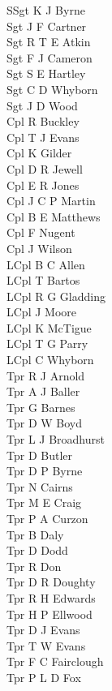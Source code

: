 \begin{multicols}{3}
  \small
  \noindent
  SSgt K J Byrne \\
  Sgt J F Cartner \\
  Sgt R T E Atkin \\
  Sgt F J Cameron \\
  Sgt S E Hartley \\
  Sgt C D Whyborn \\
  Sgt J D Wood \\
  Cpl R Buckley \\
  Cpl T J Evans \\
  Cpl K Gilder \\
  Cpl D R Jewell \\
  Cpl E R Jones \\
  Cpl J C P Martin \\
  Cpl B E Matthews \\
  Cpl F Nugent \\
  Cpl J Wilson \\
  LCpl B C Allen \\
  LCpl T Bartos \\
  LCpl R G Gladding \\
  LCpl J Moore \\
  LCpl K McTigue \\
  LCpl T G Parry \\
  LCpl C Whyborn \\
  Tpr R J Arnold \\
  Tpr A J Baller \\
  Tpr G Barnes \\
  Tpr D W Boyd \\
  Tpr L J Broadhurst \\
  Tpr D Butler \\
  Tpr D P Byrne \\
  Tpr N Cairns \\
  Tpr M E Craig \\
  Tpr P A Curzon \\
  Tpr B Daly \\
  Tpr D Dodd \\
  Tpr R Don \\
  Tpr D R Doughty \\
  Tpr R H Edwards \\
  Tpr H P Ellwood \\
  Tpr D J Evans \\
  Tpr T W Evans \\
  Tpr F C Fairclough \\
  Tpr P L D Fox \\

\end{multicols}
